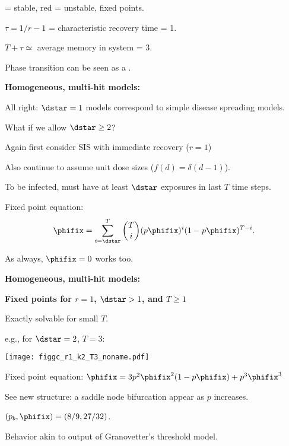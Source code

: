     = stable, \alert{red} = unstable, fixed points.
  
    $\tau = 1/r - 1$ = characteristic recovery time = 1.
  
    $T + \tau \simeq $  average memory in system = 3.
  
    Phase transition can be seen as
    a .\cite{strogatz1994a}
  

  \textbf{Homogeneous, multi-hit models:}

  
   
    All right: $\dstar=1$ models correspond
    to simple disease spreading models.
   
    What if we allow $\dstar \ge 2$?
  
    Again first consider SIS with immediate recovery ($r=1$)
  
    Also continue to assume unit dose sizes ($f(d) = \delta(d-1)$).
  
    To be infected, must have at least $\dstar$
    exposures in last $T$ time steps.
  
    Fixed point equation:
    $$
    \phifix = 
    \sum_{i=\dstar}^{T}
    \binom{T}{i}
    (p\phifix)^{i} (1 - p\phifix)^{T-i}.
    $$
  
    As always, $\phifix=0$ works too.
 


  \textbf{Homogeneous, multi-hit models:}

  \textbf{Fixed points for $r = 1$, $\dstar > 1$, and $T \ge 1$}
    
     
      Exactly solvable for small $T$.
     
      e.g., for $\dstar=2$, $T=3$:
    
  

      
          
      
      \texttt{[image: figgc\_r1\_k2\_T3\_noname.pdf]} 
        
    
    
      Fixed point equation:
      $\phifix = 3 p^2 \phifix^2 (1 - p \phifix) + p^3 \phifix^3$
    
      See new structure: a \alert{saddle node bifurcation}\cite{strogatz1994a} 
      appear as $p$ increases.
    
      $(p_b,\phifix)=(8/9,27/32)$.
    
  
  
  
    Behavior akin to output of Granovetter's threshold model.
  


